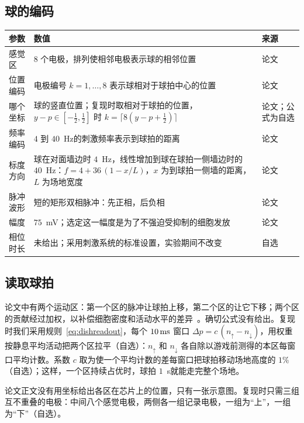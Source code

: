 \subsection*{球的编码}

\begin{center}
\footnotesize
\setlength{\tabcolsep}{4pt}
\renewcommand{\arraystretch}{1.15}
\begin{tabular}{>{\raggedright}p{3.4cm}>{\raggedright}p{7.5cm}>{\raggedright\arraybackslash}p{1.6cm}}
\toprule
参数 & 数值 & 来源 \\
\midrule
感觉区 & $8$ 个电极，排列使相邻电极表示球的相邻位置 & 论文 \\
位置编码 & 电极编号 $k=1,\dots,8$ 表示球相对于球拍中心的位置 & 论文 \\
哪个坐标 & 球的竖直位置；复现时取相对于球拍的位置，$y-p\in[-\tfrac12,\tfrac12]$ 时 $k=\lceil 8(y-p+\tfrac12)\rceil$ & 论文；公式为自选 \\
频率编码 & $4$ 到 $40$~Hz的刺激频率表示到球拍的距离 & 论文 \\
标度方向 & 球在对面墙边时 $4$~Hz，线性增加到球在球拍一侧墙边时的 $40$~Hz：$f=4+36\,(1-x/L)$，$x$ 为到球拍一侧墙的距离，$L$ 为场地宽度 & 论文 \\
脉冲波形 & 短的矩形双相脉冲：先正相，后负相 & 论文 \\
幅度 & $75$~mV；选定这一幅度是为了不强迫受抑制的细胞发放 & 论文 \\
相位时长 & 未给出；采用刺激系统的标准设置，实验期间不改变 & 自选 \\
\bottomrule
\end{tabular}
\end{center}

\subsection*{读取球拍}

论文中有两个运动区：第一个区的脉冲让球拍上移，第二个区的让它下移；两个区的贡献经过加权，以补偿细胞密度和活动水平的差异~\cite{Kagan2022}。确切公式没有给出。复现时我们采用规则~\eqref{eq:dishreadout}，每个 $10\,\text{ms}$ 窗口 $\Delta p=c\,(n_\uparrow-n_\downarrow)$，用权重按静息平均活动把两个区拉平（自选）：$n_\uparrow$ 和 $n_\downarrow$ 各自除以游戏前测得的本区每窗口平均计数。系数 $c$ 取为使一个平均计数的差每窗口把球拍移动场地高度的 $1\%$（自选）；这样，一个区持续占优时，球拍 $1$~s就能走完整个场地。

论文正文没有用坐标给出各区在芯片上的位置，只有一张示意图。复现时只需三组互不重叠的电极：中间八个感觉电极，两侧各一组记录电极，一组为“上”，一组为“下”（自选）。


